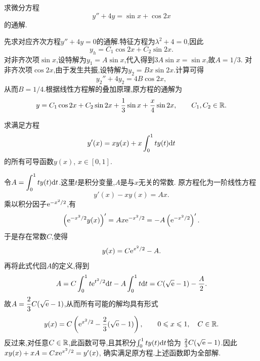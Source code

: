 \documentclass{ctexart}
\begin{document}
\begin{problem}[6.(15\songti{分})]
求微分方程
    \[y''+4y=\sin x+\cos2x\]
    的通解.
\end{problem}
\begin{solution}
先求对应齐次方程$y''+4y=0$的通解.特征方程为$\lambda^2+4=0$,因此
\[y_h=C_1\cos2x+C_2\sin2x.\]
对非齐次项$\sin x$,设特解为$y_1=A\sin x$,代入得到$3A\sin x=\sin x$,故$A=1/3$.
对非齐次项$\cos2x$,由于发生共振,设特解为$y_2=Bx\sin2x$.计算可得
\[y_2''+4y_2=4B\cos2x,\]
从而$B=1/4$.根据线性方程解的叠加原理,原方程的通解为
\[y=C_1\cos2x+C_2\sin2x+\frac13\sin x+\frac{x}{4}\sin2x,
\qquad C_1,C_2\in\mathbb{R}.\]
\end{solution}
\begin{problem}[7.(15\songti{分})]
求满足方程
    \[y'(x)=xy(x)+x\int_0^1ty(t)\mathrm{d} t\]
    的所有可导函数$y(x)$, $x\in[0,1]$.
\end{problem}
\begin{solution}
令$\displaystyle A=\int_0^1ty(t)\mathrm{d} t$.这里$t$是积分变量,$A$是与$x$无关的常数.
原方程化为一阶线性方程
\[y'(x)-xy(x)=Ax.\]
乘以积分因子$\mathrm{e}^{-x^2/2}$,有
\[\left(\mathrm{e}^{-x^2/2}y(x)\right)'=Ax\mathrm{e}^{-x^2/2}
=-A\left(\mathrm{e}^{-x^2/2}\right)'.\]
于是存在常数$C$,使得
\[y(x)=C\mathrm{e}^{x^2/2}-A.\]
再将此式代回$A$的定义,得到
\[A=C\int_0^1t\mathrm{e}^{t^2/2}\mathrm{d} t-A\int_0^1t\mathrm{d} t
=C(\sqrt{\mathrm{e}}-1)-\frac A2.\]
故$\displaystyle A=\frac23C(\sqrt{\mathrm{e}}-1)$,从而所有可能的解均具有形式
\[y(x)=C\left(\mathrm{e}^{x^2/2}-\frac23(\sqrt{\mathrm{e}}-1)\right),
\qquad0\leqslant x\leqslant1,\quad C\in\mathbb{R}.\]
反过来,对任意$C\in\mathbb{R}$,此函数可导,且其积分$\int_0^1ty(t)\mathrm{d} t$恰为
$\frac23C(\sqrt{\mathrm{e}}-1)$.因此$xy(x)+xA=Cx\mathrm{e}^{x^2/2}=y'(x)$,
确实满足原方程.上述函数即为全部解.
\end{solution}
\end{document}
